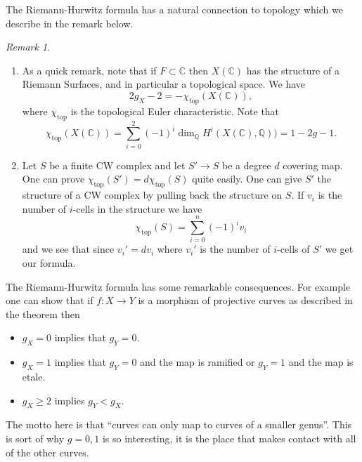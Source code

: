 \documentclass[12pt]{article}
\numberwithin{equation}{section}
\theoremstyle{definition}
\theoremstyle{remark}
\newtheorem{remark}[theorem]{Remark}
\newcommand{\QQ}{\mathbb{Q}}
\newcommand{\CC}{\mathbb{C}}
\renewcommand{\top}{\operatorname{top}}
\renewcommand{\top}{\operatorname{top}}
\begin{document}
The Riemann-Hurwitz formula has a natural connection to topology which we describe in the remark below.
\begin{remark}
\begin{enumerate}
\item As a quick remark, note that if $F \subset \CC$ then $X(\CC)$ has the structure of a Riemann Surfaces, and in particular a topological space. We have
 $$ 2 g_X - 2 = - \chi_{\top}(X(\CC)),$$
where $\chi_{\top}$ is the topological Euler characteristic.
Note that 
 $$\chi_{\top}(X(\CC)) = \sum_{i=0}^2(-1)^i \dim_{\QQ}H^i(X(\CC),\QQ)) = 1-2g-1. $$
 \item Let $S$ be a finite CW complex and let $S' \to S$ be a degree $d$ covering map. One can prove $\chi_{\top}(S') = d\chi_{\top}(S)$ quite easily. 
 One can give $S'$ the structure of a CW complex by pulling back the structure on $S$. 
 If $v_i$ is the number of $i$-cells in the structure we have 
  $$ \chi_{\top}(S) = \sum_{i=0}^n (-1)^i v_i $$
 and we see that since $v_i'=dv_i$ where $v_i'$ is the number of $i$-cells of $S'$ we get our formula.
\end{enumerate}

The Riemann-Hurwitz formula has some remarkable consequences. 
For example one can show that if $f:X\to Y$ is a morphism of projective curves as described in the theorem then 
\begin{itemize}
	\item $g_X=0$ implies that $g_Y=0$.
	\item $g_X=1$ implies that $g_Y=0$ and the map is ramified or $g_Y=1$ and the map is etale. 
	\item $g_X\geq 2$ implies $g_Y < g_X$. 
\end{itemize}
The motto here is that ``curves can only map to curves of a smaller genus''. 
This is sort of why $g=0,1$ is so interesting, it is the place that makes contact with all of the other curves. 
\end{remark}
\end{document}
